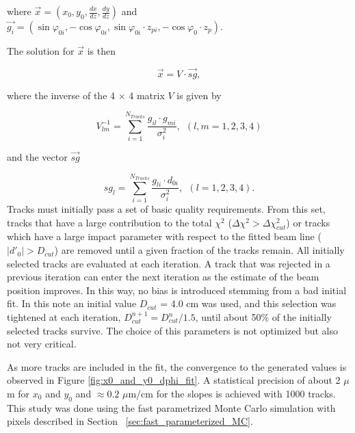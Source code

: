 \documentclass{cmspaper}
\begin{document}
\noindent
where $\vec{x} = (x_0,y_0,\frac{dx}{dz},\frac{dy}{dz})$ and 
$\vec{g_i} = ( \sin\varphi_{0i}, -\cos\varphi_{0i},\sin\varphi_{0i} \cdot z_{pi}, 
-\cos\varphi_0\cdot z_p)$.


\noindent
The solution for $\vec{x}$ is then

\begin{equation}
\vec{x}= V \cdot \vec{sg},
\end{equation} 

\noindent
where the inverse of the 4 $\times$ 4 matrix $V$ is given by

\begin{equation}
V^{-1}_{lm} = \sum_{i=1}^{N_{Tracks}}\frac{g_{il} \cdot g_{mi}}{\sigma_i^2},~~(l,m = 1,2,3,4)
\end{equation} 


\noindent
and the vector $\vec{sg}$ 

\begin{equation}
sg_l = \sum_{i=1}^{N_{Tracks}} \frac{g_{li} \cdot d_{0i}}{\sigma_i^2}, ~~(l = 1,2,3,4).
\end{equation} 
Tracks must initially pass a set of basic quality requirements.
From this set, tracks that have a large contribution to   
the total $\chi^2$ ($\Delta \chi^2 > \Delta\chi^2_{cut}$) or tracks which 
have a large impact parameter with respect to the fitted beam line  
($|d'_0| > D_{cut} $) are removed until a given fraction of the tracks remain.
All initially selected tracks are evaluated at each iteration. A track that 
was rejected in a previous iteration can enter the next iteration
as the estimate of the beam position improves. In this way, no bias is introduced stemming from a bad initial fit. 
In this note an initial value  $D_{cut}$ = 4.0 cm was used, and this selection was tightened at each iteration, $D^{n+1}_{cut}= D^{n}_{cut}/1.5$, until 
about 50\% of the initially selected tracks survive. The choice of  this parameters is not optimized but also not very critical. 


As more tracks are included in the fit, the convergence to the generated values is observed in Figure \ref{fig:x0_and_y0_dphi_fit}.
A statistical precision of about 2  $\mu$m for $x_0$ and $y_0$  and $\approx 0.2$ $\mu$m/cm for the slopes is achieved with 1000 tracks.
This study was done using the fast parametrized Monte Carlo simulation with pixels described in Section ~\ref{sec:fast_parameterized_MC}.
\end{document}
